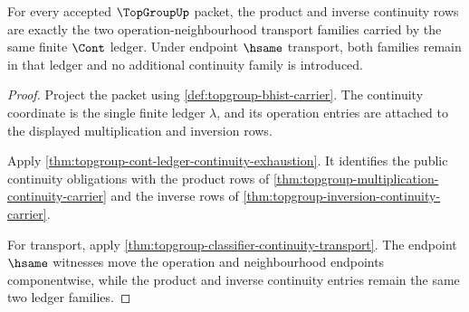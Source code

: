 \begin{theorem}
\label{thm:topgroup-operation-continuity-ledger-scope}
For every accepted $\TopGroupUp$ packet, the product and inverse continuity
rows are exactly the two operation-neighbourhood transport families carried
by the same finite $\Cont$ ledger. Under endpoint $\hsame$ transport, both
families remain in that ledger and no additional continuity family is
introduced.
\end{theorem}
\begin{proof}
Project the packet using \autoref{def:topgroup-bhist-carrier}. The
continuity coordinate is the single finite ledger $\lambda$, and its
operation entries are attached to the displayed multiplication and inversion
rows.

Apply \autoref{thm:topgroup-cont-ledger-continuity-exhaustion}. It identifies
the public continuity obligations with the product rows of
\autoref{thm:topgroup-multiplication-continuity-carrier} and the inverse rows
of \autoref{thm:topgroup-inversion-continuity-carrier}.

For transport, apply
\autoref{thm:topgroup-classifier-continuity-transport}. The endpoint
$\hsame$ witnesses move the operation and neighbourhood endpoints
componentwise, while the product and inverse continuity entries remain the
same two ledger families.
\end{proof}


